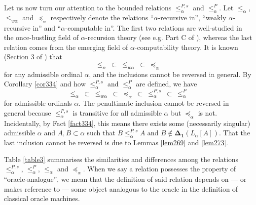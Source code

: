 \documentclass[12pt]{article}
\numberwithin{equation}{section}
\begin{document}
Let us now turn our attention to the bounded relations $\leq^{P, s}_{\alpha}$ and $\leq^P_{\alpha}$. Let $\leq_{\alpha}$, $\leq_{w \alpha}$ and $\preceq_{\alpha}$ respectively denote the relations ``$\alpha$-recursive in'', ``weakly $\alpha$-recursive in'' and ``$\alpha$-computable in''. The first two relations are well-studied in the once-bustling field of $\alpha$-recursion theory (see e.g. Part C of \cite{sacks}), whereas the last relation comes from the emerging field of $\alpha$-computability theory. It is known (Section 3 of \cite{koepke2}) that 
\begin{equation*}
    \leq_{\alpha} \ \subset \ \leq_{w \alpha} \ \subset \ \preceq_{\alpha}
\end{equation*}
for any admissible ordinal $\alpha$, and the inclusions cannot be reversed in general. By Corollary \ref{cor334} and how $\leq^{P, s}_{\alpha}$ and $\leq^P_{\alpha}$ are defined, we have
\begin{equation}\label{eq2}
    \leq_{\alpha} \ \subset \ \leq_{w \alpha} \ \subset \ \preceq_{\alpha} \ \subset \ \leq^{P, s}_{\alpha} \ \subset \ \leq^P_{\alpha}
\end{equation}
for admissible ordinals $\alpha$. The penultimate inclusion cannot be reversed in general because $\leq^{P, s}_{\alpha}$ is transitive for all admissible $\alpha$ but $\preceq_{\alpha}$ is not. Incidentally, by Fact \ref{fact334}, this means there exists some (necessarily singular) admissible $\alpha$ and $A, B \subset \alpha$ such that $B \leq^{P, s}_{\alpha} A$ and $B \not\in \mathbf{\Delta_1}(L_{\alpha}[A])$. That the last inclusion cannot be reversed is due to Lemmas \ref{lem269} and \ref{lem273}.  

Table \ref{table3} summarises the similarities and differences among the relations $\leq^{P, s}_{\alpha}$, $\leq^P_{\alpha}$, $\leq_{\alpha}$ and $\preceq_{\alpha}$. When we say a relation possesses the property of ``oracle-analogue'', we mean that the definition of said relation depends on --- or makes reference to --- some object analogous to the oracle in the definition of classical oracle machines.
\end{document}
